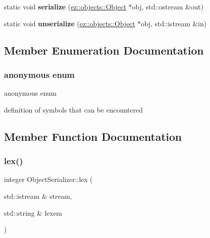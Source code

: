 \begin{DoxyCompactItemize}
\item 
\mbox{\label{classez_1_1objects_1_1ObjectSerializer_a72b078f9fdaa2c4c4267a06ba3b0d916}} 
static void {\bfseries serialize} (\hyperlink{classez_1_1objects_1_1Object}{ez\+::objects\+::\+Object} $\ast$obj, std\+::ostream \&out)
\item 
\mbox{\label{classez_1_1objects_1_1ObjectSerializer_a23fb04c7e0e499c60f850536ef49daaf}} 
static void {\bfseries unserialize} (\hyperlink{classez_1_1objects_1_1Object}{ez\+::objects\+::\+Object} $\ast$obj, std\+::istream \&in)
\end{DoxyCompactItemize}


\subsection{Member Enumeration Documentation}
\mbox{\label{classez_1_1objects_1_1ObjectSerializer_af5cff5aa2658b6f48adeed4489bd9b5d}} 
\subsubsection{\texorpdfstring{anonymous enum}{anonymous enum}}
{\footnotesize\ttfamily anonymous enum}

definition of symbols that can be encountered 

\subsection{Member Function Documentation}
\mbox{\label{classez_1_1objects_1_1ObjectSerializer_a35016a821006ca66f92a38f5fd686cab}} 
\subsubsection{\texorpdfstring{lex()}{lex()}}
{\footnotesize\ttfamily integer Object\+Serializer\+::lex (\begin{DoxyParamCaption}\item[{std\+::istream \&}]{stream,  }\item[{std\+::string \&}]{lexem }\end{DoxyParamCaption})\hspace{0.3cm}{\ttfamily [static]}}

